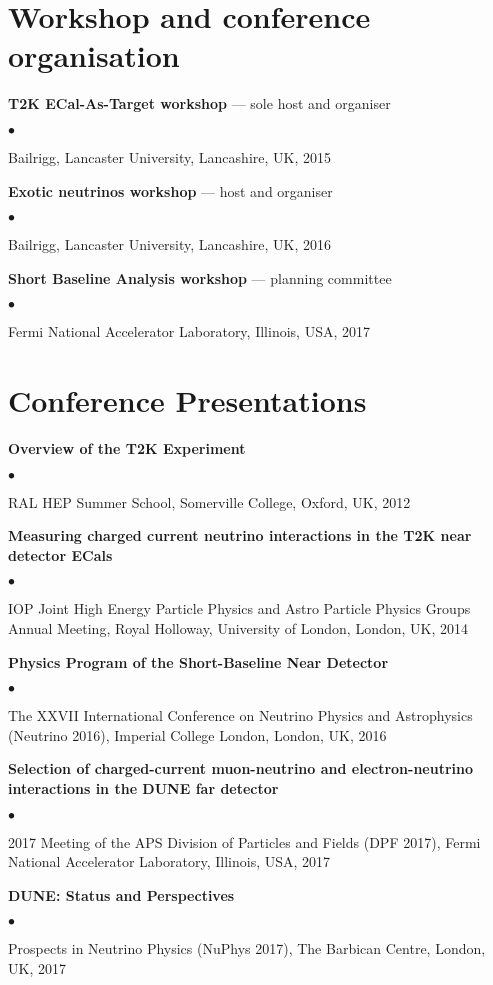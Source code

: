 \documentclass[margin,line]{res}
\newenvironment{list2}{
  \begin{list}{$\bullet$}{%
      \setlength{\itemsep}{0in}
      \setlength{\parsep}{0in} \setlength{\parskip}{0in}
      \setlength{\topsep}{0in} \setlength{\partopsep}{0in} 
      \setlength{\leftmargin}{0.2in}}}{\end{list}}
\begin{document}
\begin{resume}
\section{\sc Workshop and conference organisation}
{\bf T2K ECal-As-Target workshop} --- sole host and organiser
\begin{list2}
\item Bailrigg, Lancaster University, Lancashire, UK, 2015
\end{list2}
{\bf Exotic neutrinos workshop} --- host and organiser
\begin{list2}
\item Bailrigg, Lancaster University, Lancashire, UK, 2016
\end{list2}
{\bf Short Baseline Analysis workshop} --- planning committee
\begin{list2}
\item Fermi National Accelerator Laboratory, Illinois, USA, 2017
\end{list2}

\section{\sc Conference Presentations}

{\bf Overview of the T2K Experiment}
\begin{list2}
\item RAL HEP Summer School, Somerville College, Oxford, UK, 2012
\end{list2}
{\bf Measuring charged current neutrino interactions in the T2K near detector ECals}
\begin{list2}
\item IOP Joint High Energy Particle Physics and Astro Particle Physics Groups Annual Meeting, Royal Holloway, University of London, London, UK, 2014
\end{list2}
{\bf Physics Program of the Short-Baseline Near Detector}
\begin{list2}
\item The XXVII International Conference on Neutrino Physics and Astrophysics (Neutrino 2016), Imperial College London, London, UK, 2016
\end{list2}
{\bf Selection of charged-current muon-neutrino and electron-neutrino interactions in the DUNE far detector}
\begin{list2}
\item 2017 Meeting of the APS Division of Particles and Fields (DPF 2017), Fermi National Accelerator Laboratory, Illinois, USA, 2017
\end{list2}
{\bf DUNE: Status and Perspectives}
\begin{list2}
\item Prospects in Neutrino Physics (NuPhys 2017), The Barbican Centre, London, UK, 2017
\end{list2}


\end{resume}
\end{document}
